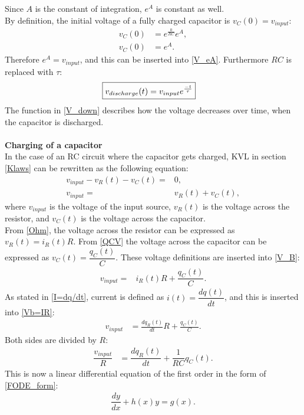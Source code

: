 Since $A$ is the constant of integration, $e^A$ is constant as well.
\\
By definition, the initial voltage of a fully charged capacitor is $v_C(0)=v_{input}$:
 \begin{align*}
	v_C(0) &= e^{\frac{0}{RC}}e^A, \\
	v_C(0) &= e^A.
 \end{align*}
Therefore $e^A = v_{input}$, and this can be inserted into \eqref{V_eA}. Furthermore $RC$ is replaced with $\tau$:
\begin{align}
\label{V_down}
\Aboxed{
 v_{discharge}(t) = v_{input}e^{\frac{-t}{\tau}}
 }
\end{align}
The function in \eqref{V_down} describes how the voltage decreases over time, when the capacitor is discharged.
\\
\\
\textbf{Charging of a capacitor}\\
In the case of an RC circuit where the capacitor gets charged, KVL in section \ref{Klaws} can be rewritten as the following equation:
\begin{align}
v_{input}-v_R(t)-v_C(t) =& 0, \nonumber \\
v_{input} =& v_R(t)+v_C(t), \label{V_B}
\end{align}
where $v_{input}$ is the voltage of the input source, $v_R(t)$ is the voltage across the resistor, and $v_C(t)$ is the voltage across the capacitor. 
\\
From \eqref{Ohm}, the voltage across the resistor can be expressed as $v_R(t)=i_{R}(t) R$. From \eqref{QCV} the voltage across the capacitor can be expressed as $v_C(t)=\dfrac{q_C (t)}{C}$. These voltage definitions are inserted into \eqref{V_B}:
\begin{align}
v_{input} =& i_{R}(t) R + \dfrac{q_C (t)}{C}. \label{Vb=IR}
\end{align}
As stated in \eqref{I=dq/dt}, current is defined as $i(t) =\dfrac{dq(t)}{dt}$, and this is inserted into \eqref{Vb=IR}:
 \begin{align*}
 	v_{input} &= \frac{dq_R(t)}{dt} R + \frac{q_C (t)}{C}.
 \end{align*}
Both sides are divided by $R$:
\begin{align}
\dfrac{v_{input}}{R} &= \dfrac{dq_R(t)}{dt} + \dfrac{1}{RC}q_C(t).\label{Vb/R} 
\end{align}
This is now a linear differential equation of the first order in the form of \eqref{FODE_form}:
\begin{align*}
\dfrac{dy}{dx}+h(x)y=g(x).
\end{align*}
